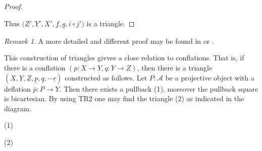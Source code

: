 \documentclass[11pt]{article}
\theoremstyle{definition}
\theoremstyle{remark}
\newtheorem*{remark}{Remark}
\newcommand{\upside}[1]{\rotatebox[origin=c]{180}{#1}}
\begin{document}
\begin{proof}
\begin{center}
\begin{tikzcd}
                    \end{tikzcd}
                \end{center}
                Thus $(\underline{Z'},\underline{Y'},\underline{X'},\underline{f},\underline{g},$\underline{\upside{$\Omega$}$i\circ j'$}$)$ is a triangle. 
            \end{proof}

            \begin{remark}
                A more detailed and different proof may be found in \cite{Hol12} or \cite{Mat20}.
            \end{remark}

            This construction of triangles givves a close relation to conflations. That is, if there is a conflation $(p:X\rightarrow Y,q:Y\rightarrow Z)$, then there is a triangle $(\underline{X},\underline{Y},\underline{Z},\underline{p},\underline{q},-\underline{r})$ constructed as follows. Let $P:\mathcal{A}$ be a projective object with a deflation $\bar{p}:P\rightarrow Y$. Then there exists a pullback (1), moreover the pullback square is bicartesian. By using TR2 one may find the triangle (2) as indicated in the diagram.
            \begin{center}
                (1)
                (2)
            \end{center}
\end{document}
